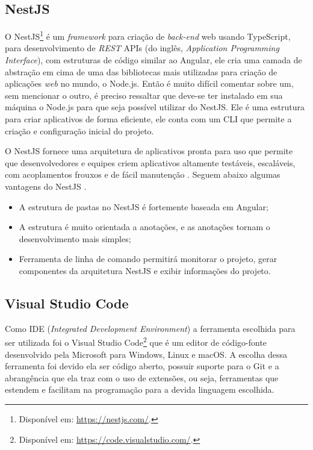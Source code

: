 \subsection{NestJS}
\label{ssec:NestJS}
O NestJS\footnote{Disponível em: \url{https://nestjs.com/}.} é um \textit{framework} para criação de \textit{back-end} web usando TypeScript, para desenvolvimento de \textit{REST} APIs (do inglês, \textit{Application Programming Interface}), com estruturas de código similar ao Angular, ele cria uma camada de abstração em cima de uma das bibliotecas mais utilizadas para criação de aplicações \textit{web} no mundo, o Node.js.  Então é muito difícil comentar sobre um, sem mencionar o outro, é preciso ressaltar que deve-se ter instalado em sua máquina o Node.js para que seja possível utilizar do NestJS. Ele é uma estrutura para criar aplicativos de forma eficiente, ele conta com um CLI que permite a criação e configuração inicial do projeto.

O NestJS fornece uma arquitetura de aplicativos pronta para uso que permite que desenvolvedores e equipes criem aplicativos altamente testáveis, escaláveis, com acoplamentos frouxos e de fácil manutenção \cite{kamil2020nestjs}. Seguem abaixo algumas vantagens do NestJS .

\begin{itemize}
    \item A estrutura de pastas no NestJS é fortemente baseada em Angular; 
    \item A estrutura é muito orientada a anotações, e as anotações tornam o desenvolvimento mais simples;   
    \item Ferramenta de linha de comando permitirá monitorar o projeto, gerar componentes da arquitetura NestJS e exibir informações do projeto.
\end{itemize}

\subsection{Visual Studio Code}
\label{ssec:VSCode}
Como IDE (\textit{Integrated Development Environment}) a ferramenta escolhida para ser utilizada foi o Visual Studio Code\footnote{Disponível em: \url{https://code.visualstudio.com/}.} que é um editor de código-fonte desenvolvido pela Microsoft para Windows, Linux e macOS. A escolha dessa ferramenta foi devido ela ser código aberto, possuir suporte para o Git e a abrangência que ela traz com o uso de extensões, ou seja, ferramentas que estendem e facilitam na programação para a devida linguagem escolhida.

